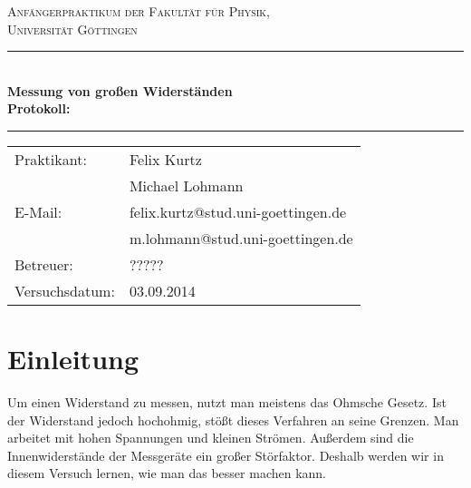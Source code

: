 \documentclass[12pt,a4paper,titlepage,headinclude,bibtotoc]{scrartcl}
\begin{document}
\begin{titlepage}
\centering
\textsc{\Large Anfängerpraktikum der Fakultät für
  Physik,\\[1.5ex] Universität Göttingen}

\vspace*{4.2cm}

\rule{\textwidth}{1pt}\\[0.5cm]
{\huge \bfseries
  Messung von großen Widerständen\\[1.5ex]
  Protokoll:}\\[0.5cm]
\rule{\textwidth}{1pt}

\vspace*{3.0cm}

\begin{Large}
\begin{tabular}{ll}
Praktikant:
 	&  Felix Kurtz\\
 	&  Michael Lohmann\\

E-Mail: 
	&  felix.kurtz@stud.uni-goettingen.de\\
	& m.lohmann@stud.uni-goettingen.de\\

 Betreuer: & ?????\\
 Versuchsdatum: &  03.09.2014\\
\end{tabular}
\end{Large}

\vspace*{0.8cm}

\begin{Large}
\end{Large}

\end{titlepage}

\tableofcontents

\newpage

\section{Einleitung}
\label{sec:einleitung}
Um einen Widerstand zu messen, nutzt man meistens das Ohmsche Gesetz.
Ist der Widerstand jedoch hochohmig, stößt dieses Verfahren an seine Grenzen.
Man arbeitet mit hohen Spannungen und kleinen Strömen.
Außerdem sind die Innenwiderstände der Messgeräte ein großer Störfaktor.
Deshalb werden wir in diesem Versuch lernen, wie man das besser machen kann. 
\end{document}
